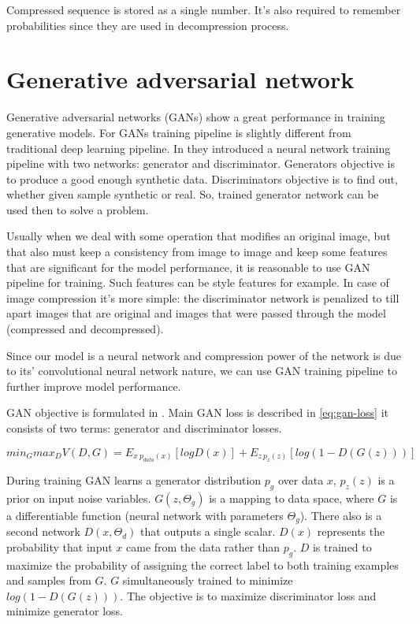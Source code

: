 Compressed sequence is stored as a single number. It's also required to remember probabilities since they are used in decompression process.

\section{Generative adversarial network}

Generative adversarial networks (GANs) show a great performance in training generative models. For GANs training pipeline is slightly different from traditional deep learning pipeline. In \cite{Goodfellow_Pouget-Abadie_Mirza_Xu_Warde-Farley_Ozair_Courville_Bengio_2014} they introduced a neural network training pipeline with two networks: generator and discriminator. Generators objective is to produce a good enough synthetic data. Discriminators objective is to find out, whether given sample synthetic or real. So, trained generator network can be used then to solve a problem.

Usually when we deal with some operation that modifies an original image, but that also must keep a consistency from image to image and keep some features that are significant for the model performance, it is reasonable to use GAN pipeline for training. Such features can be style features for example. In case of image compression it's more simple: the discriminator network is penalized to till apart images that are original and images that were passed through the model (compressed and decompressed).

Since our model is a neural network and compression power of the network is due to its' convolutional neural network nature, we can use GAN training pipeline to further improve model performance.

GAN objective is formulated in \cite{Goodfellow_Pouget-Abadie_Mirza_Xu_Warde-Farley_Ozair_Courville_Bengio_2014}. Main GAN loss is described in \ref{eq:gan-loss} it consists of two terms: generator and discriminator losses.

\begin{equation}
    \label{eq:gan-loss}
    min_G max_D V(D, G) = E_{x~p_{data}(x)} [log D(x)] + E_{z~p_z(z)} [log(1 - D(G(z)))]
\end{equation}

During training GAN learns a generator distribution $p_g$ over data $x$, $p_z(z)$ is a prior on input noise variables. $G(z, \Theta_g)$ is a mapping to data space, where $G$ is a differentiable function (neural network with parameters $\Theta_g$). There also is a second network $D(x, \Theta_d)$ that outputs a single scalar. $D(x)$ represents the probability that input $x$ came from the data rather than $p_g$. $D$ is trained to maximize the probability of assigning the correct label to both training examples and samples from $G$. $G$ simultaneously trained to minimize $log(1 − D(G(z)))$. The objective is to maximize discriminator loss and minimize generator loss.

